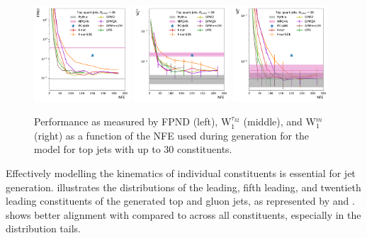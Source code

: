 \begin{figure}[tb]
    \centering
    \includegraphics[width=0.32\textwidth]{Figures/jet_generation/droid/30/metrics_vs_steps/t/t_fpnd.pdf}
    \includegraphics[width=0.32\textwidth]{Figures/jet_generation/droid/30/metrics_vs_steps/t/t_w1_tau_32.pdf}
    \includegraphics[width=0.32\textwidth]{Figures/jet_generation/droid/30/metrics_vs_steps/t/t_w1m.pdf}
    \caption{Performance as measured by FPND (left), W$_1^{\tau_{32}}$ (middle), and W$_1^m$ (right) as a function of the NFE used during generation for the \pcdroid model for top jets with up to 30 constituents.}
    \label{fig:metrics_vs_steps-30}
\end{figure}

Effectively modelling the kinematics of individual constituents is essential for jet generation.
 illustrates the \pt distributions of the leading, fifth leading, and twentieth leading constituents of the generated top and gluon jets, as represented by \pcdroid and \pcjedi.
\pcdroid shows better alignment with \pythia compared to \pcjedi across all constituents, especially in the distribution tails.

